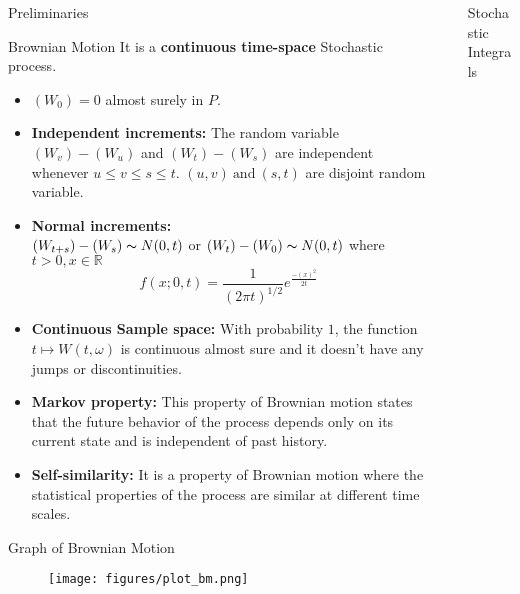 \documentclass[final]{beamer}
\newlength{\sepwidth}
\newlength{\colwidth}
\newcommand{\separatorcolumn}{\begin{column}{\sepwidth}\end{column}}
\begin{document}
\begin{frame}[t]
\begin{columns}[t]
\begin{column}{\colwidth}
\begin{block}{Preliminaries}
  \end{block}

  \begin{alertblock}{Brownian Motion}
    It is a \textbf{continuous time-space} Stochastic process.
    \begin{itemize}
    \item $(W_0) = 0$ almost surely in $P$.
    \item \textbf{Independent increments:} 
    The random variable $(W_v)-(W_u)$ and $(W_t)-(W_s)$ are independent whenever $u\leq v \leq s \leq t$. $(u,v) \ \text{and} \  (s,t)$ are disjoint random variable.
    \item \textbf{Normal increments:}\\
    $(W_{t+s})-(W_s)  \thicksim N(0,t)$ or  $(W_{t})-(W_0)  \thicksim N(0,t)$  where $t > 0, x \in \mathbb{R}$ 
    \[ f(x;0,t) = \frac{1}{(2\pi t)^{1/2}} e^{\frac{-(x)^{2}}{2t}}\]
    \item \textbf{Continuous Sample space:}
    With probability $1$, the function $t \mapsto W(t,\omega)$ is continuous almost sure and it doesn't have any jumps or discontinuities.
    \item \textbf{Markov property:}
    This property of Brownian motion states that the future behavior of the process depends only on its current state and is independent of past history.
    \item \textbf{Self-similarity:}
    It is a property of Brownian motion where the statistical properties of the process are similar at different time scales.
\end{itemize}
  \end{alertblock}
  \begin{block}{Graph of Brownian Motion}
      \begin{figure}
      \centering
                    \texttt{[image: figures/plot\_bm.png]}
    \end{figure}
  \end{block}
  

\end{column}

\separatorcolumn

\begin{column}{\colwidth}

  \begin{block}{Stochastic Integrals}
  

\end{block}
\end{column}
\end{columns}
\end{frame}
\end{document}
